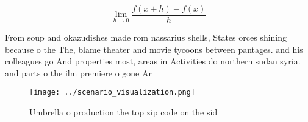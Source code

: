 \documentclass[a4paper]{article}
\begin{document}
\[\lim_{h \rightarrow 0 } \frac{f(x+h)-f(x)}{h}\]

From soup and okazudishes made rom nassarius shells, States orces shining because o the The, blame theater and movie tycoons between pantages. and his colleagues go And properties most, areas in Activities do northern sudan syria. and parts o the ilm premiere o gone Ar

\begin{figure}
\centering
\texttt{[image: ../scenario\_visualization.png]}
\caption{Umbrella o production the top zip code on the sid
}
\end{figure}
 
\end{document}
